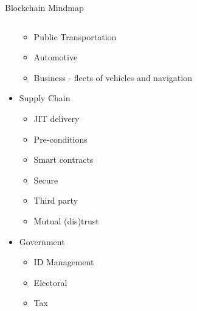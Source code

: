 \documentclass[pdf,table]{beamer}
\begin{document}
\begin{frame}{Blockchain Mindmap}
\begin{columns}[T]
\begin{column}{0.4\textwidth}
\begin{itemize}
			\begin{itemize}
				\item Public Transportation
				\item Automotive
				\item Business \-- fleets of vehicles and navigation
			\end{itemize}
		\item<5|only@5> Supply Chain
			\begin{itemize}
				\item JIT delivery
				\item Pre-conditions
				\item Smart contracts
				\item Secure
				\item Third party
				\item Mutual (dis)trust
			\end{itemize}
	
		\item<6|only@6> Government
			\begin{itemize}
				\item ID Management
				\item Electoral
				\item Tax
			\end{itemize}


\end{itemize}
\end{column}
\end{columns}
\end{frame}
\end{document}
